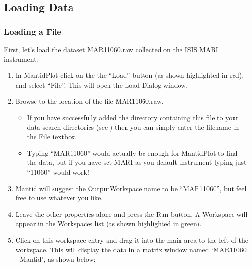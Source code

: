 \documentclass[letterpaper,10pt,english,openany]{sphinxmanual}
\begin{document}
\subsection{Loading Data}
\label{\detokenize{mantid_basic_course/loading_and_displaying_data/01_loading_data:loading-data}}\label{\detokenize{mantid_basic_course/loading_and_displaying_data/01_loading_data:id1}}\label{\detokenize{mantid_basic_course/loading_and_displaying_data/01_loading_data::doc}}
\begin{figure}[H]
\centering

\noindent{}
\end{figure}


\subsubsection{Loading a File}
\label{\detokenize{mantid_basic_course/loading_and_displaying_data/01_loading_data:loading-a-file}}
First, let’s load the dataset MAR11060.raw collected on the ISIS MARI
instrument:
\begin{enumerate}
\def\theenumi{\arabic{enumi}}
\def\labelenumi{\theenumi .}
\makeatletter\def\p@enumii{\p@enumi \theenumi .}\makeatother
\item {} 
In MantidPlot click on the the “Load” button (as shown highlighted in
red), and select “File”. This will open the Load Dialog window.

\item {} 
Browse to the location of the file MAR11060.raw.
\begin{itemize}
\item {} 
If you have successfully added the directory containing this file
to your data search directories (see
{\hyperref[\detokenize{mantid_basic_course/getting_started/getting_started:getting-started}]{}}) then you can simply
enter the filename in the File textbox.

\item {} 
Typing “MAR11060” would actually be enough for MantidPlot to find
the data, but if you have set MARI as you default instrument
typing just “11060” would work!

\end{itemize}

\item {} 
Mantid will suggest the OutputWorkspace name to be “MAR11060”, but
feel free to use whatever you like.

\item {} 
Leave the other properties alone and press the Run button. A
Workspace will appear in the Workspaces list (as shown highlighted in
green).

\item {} 
Click on this workspace entry and drag it into the main area to the
left of the workspace. This will display the data in a matrix window
named ‘MAR11060 - Mantid’, as shown below:

\end{enumerate}
\end{document}
